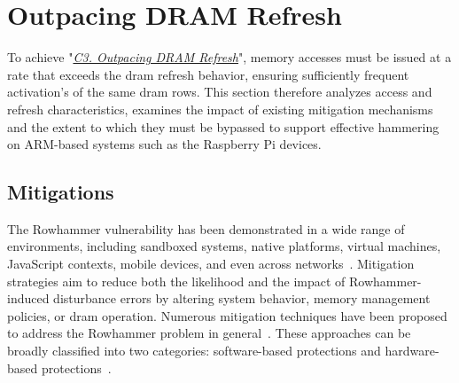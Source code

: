 \section{Outpacing DRAM Refresh} \label{sec:fast}
    To achieve "\textit{\hyperref[ch:fast]{C3. Outpacing DRAM Refresh}}", memory accesses must be issued at a rate that 
    exceeds the \gls{dram} refresh behavior, ensuring sufficiently frequent activation's of the same \gls{dram} rows. 
    This section therefore analyzes access and refresh characteristics, examines the impact of existing 
    mitigation mechanisms and the extent to which they must be bypassed to support effective hammering 
    on ARM-based systems such as the Raspberry Pi devices.

    \subsection{Mitigations} \label{subsec:mitigations}
        The Rowhammer vulnerability has been demonstrated in a wide range of environments, including sandboxed 
        systems, native platforms, virtual machines, JavaScript contexts, mobile devices, and even across 
        networks~\cite{paperHalfDouble}. Mitigation strategies aim to reduce both the likelihood and the impact of Rowhammer-induced 
        disturbance errors by altering system behavior, memory management policies, or \gls{dram} operation. Numerous 
        mitigation techniques have been proposed to address the Rowhammer problem in general~\cite{paperTriggeringRHHardwareFault}. 
        These approaches can be broadly classified into two categories: software-based protections and 
        hardware-based protections~\cite{paperTRRScope, paperDrammer}.
        
